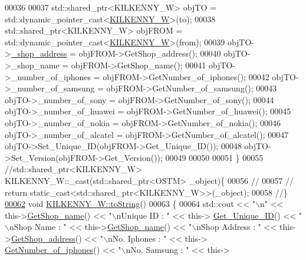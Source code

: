 \begin{DoxyCode}
00036 
00037     std::shared\_ptr<KILKENNY\_W> objTO = std::dynamic\_pointer\_cast<\hyperlink{class_k_i_l_k_e_n_n_y___w}{KILKENNY\_W}>(to);
00038     std::shared\_ptr<KILKENNY\_W> objFROM = std::dynamic\_pointer\_cast<\hyperlink{class_k_i_l_k_e_n_n_y___w}{KILKENNY\_W}>(from);
00039     objTO->\hyperlink{class_k_i_l_k_e_n_n_y___w_a278c416a60d21ee6ffa400f6d1348fd5_a278c416a60d21ee6ffa400f6d1348fd5}{\_shop\_address} = objFROM->GetShop\_address();
00040     objTO->\_shop\_name = objFROM->GetShop\_name();
00041     objTO->\_number\_of\_iphones = objFROM->GetNumber\_of\_iphones();
00042     objTO->\_number\_of\_samsung = objFROM->GetNumber\_of\_samsung();
00043     objTO->\_number\_of\_sony = objFROM->GetNumber\_of\_sony();
00044     objTO->\_number\_of\_huawei = objFROM->GetNumber\_of\_huawei();
00045     objTO->\_number\_of\_nokia = objFROM->GetNumber\_of\_nokia();
00046     objTO->\_number\_of\_alcatel = objFROM->GetNumber\_of\_alcatel();
00047     objTO->Set\_Unique\_ID(objFROM->Get\_Unique\_ID());
00048     objTO->Set\_Version(objFROM->Get\_Version());
00049     
00050    
00051 \}
00055 \textcolor{comment}{//std::shared\_ptr<KILKENNY\_W> KILKENNY\_W::\_cast(std::shared\_ptr<OSTM> \_object)\{}
00056 \textcolor{comment}{//    }
00057 \textcolor{comment}{//    return static\_cast<std::shared\_ptr<KILKENNY\_W>>(\_object);}
00058 \textcolor{comment}{//\}}
\hypertarget{_k_i_l_k_e_n_n_y___w_8cpp_source.tex_l00062}{}\hyperlink{class_k_i_l_k_e_n_n_y___w_aea627b4c0efd0f725363556afe1ad849_aea627b4c0efd0f725363556afe1ad849}{00062} \textcolor{comment}{}\textcolor{keywordtype}{void} \hyperlink{class_k_i_l_k_e_n_n_y___w_aea627b4c0efd0f725363556afe1ad849_aea627b4c0efd0f725363556afe1ad849}{KILKENNY\_W::toString}()
00063 \{
00064    std::cout << \textcolor{stringliteral}{"\(\backslash\)n"} <<  this->\hyperlink{class_k_i_l_k_e_n_n_y___w_a93dac05f03edc97797f89501aa2af73a_a93dac05f03edc97797f89501aa2af73a}{GetShop\_name}() << \textcolor{stringliteral}{"\(\backslash\)nUnique ID : "} << this->
      \hyperlink{class_o_s_t_m_a5a01a8b98d16b1d1904ecf9356e7b71d_a5a01a8b98d16b1d1904ecf9356e7b71d}{Get\_Unique\_ID}() << \textcolor{stringliteral}{"\(\backslash\)nShop Name : "}  << this->\hyperlink{class_k_i_l_k_e_n_n_y___w_a93dac05f03edc97797f89501aa2af73a_a93dac05f03edc97797f89501aa2af73a}{GetShop\_name}() << \textcolor{stringliteral}{"\(\backslash\)nShop Address : 
      "} << this->\hyperlink{class_k_i_l_k_e_n_n_y___w_ad35a9d60fff2a3c1088f93ff04e6d9d4_ad35a9d60fff2a3c1088f93ff04e6d9d4}{GetShop\_address}() << \textcolor{stringliteral}{"\(\backslash\)nNo. Iphones : "} << this->
      \hyperlink{class_k_i_l_k_e_n_n_y___w_aa8eb9ca20372744a05ab64def268a940_aa8eb9ca20372744a05ab64def268a940}{GetNumber\_of\_iphones}() << \textcolor{stringliteral}{"\(\backslash\)nNo. Samsung : "} << this->

\end{DoxyCode}
